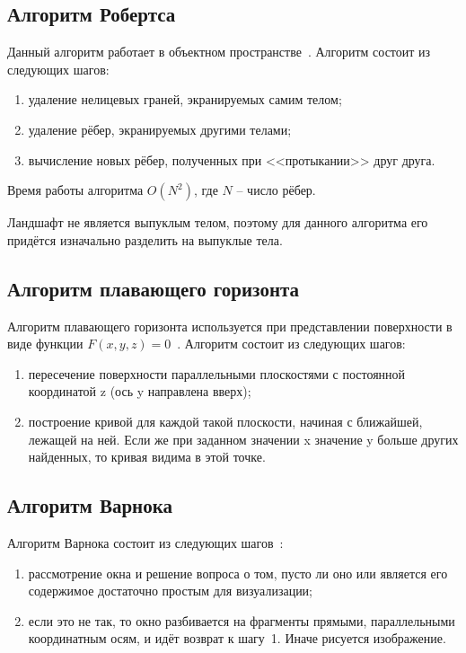 \subsection{Алгоритм Робертса}

Данный алгоритм работает в объектном пространстве~\cite{lost}. Алгоритм состоит из следующих шагов: 

\begin{enumerate}
	\item удаление нелицевых граней, экранируемых самим телом;
	\item удаление рёбер, экранируемых другими телами;
	\item вычисление новых рёбер, полученных при <<протыкании>> друг друга.
\end{enumerate}

Время работы алгоритма $O(N^2)$, где $N$ -- число рёбер.

Ландшафт не является выпуклым телом, поэтому для данного алгоритма его придётся изначально разделить на выпуклые тела.

\subsection{Алгоритм плавающего горизонта}

Алгоритм плавающего горизонта используется при представлении поверхности в виде функции $F(x,y,z)=0$~\cite{golovnin}. Алгоритм состоит из следующих шагов:

\begin{enumerate}
	\item пересечение поверхности параллельными плоскостями с постоянной координатой z (ось y направлена вверх);
	\item построение кривой для каждой такой плоскости, начиная с ближайшей, лежащей на ней. Если же при заданном значении x значение y больше других найденных, то кривая видима в этой точке.
\end{enumerate}

\subsection{Алгоритм Варнока}

Алгоритм Варнока состоит из следующих шагов~\cite{cannon}:

\begin{enumerate}
	\item \label{step:varnok1}рассмотрение окна и решение вопроса о том, пусто ли оно
	или является его содержимое достаточно простым для визуализации;
	\item если это не так, то окно разбивается на фрагменты прямыми, параллельными координатным осям, и идёт возврат к шагу~1. Иначе рисуется изображение.
\end{enumerate}

